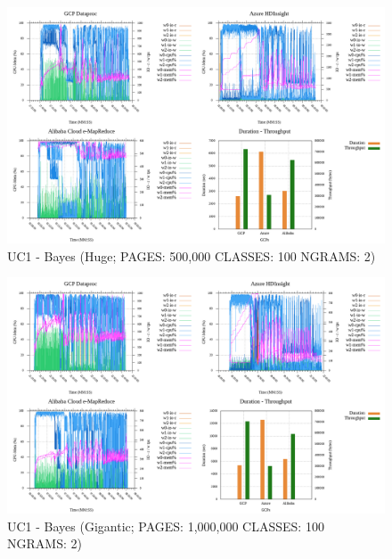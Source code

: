 \documentclass[review]{elsarticle}
\begin{document}
\begin{figure}[p]
	\caption{UC1 - Bayes (Huge; PAGES: 500,000 CLASSES: 100 NGRAMS: 2)}
	\label{fig:uc1-bayes-h-cmidt}
	\includegraphics[width=\textwidth]{uc1-bayes-h-cmidt}
	\centering
\end{figure}

\begin{figure}[p]
	\caption{UC1 - Bayes (Gigantic; PAGES: 1,000,000 CLASSES: 100 NGRAMS: 2)}
	\label{fig:uc1-bayes-g-cmidt}
	\includegraphics[width=\textwidth]{uc1-bayes-g-cmidt}
	\centering
\end{figure}
\end{document}

